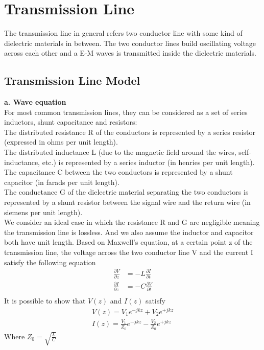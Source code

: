 \documentclass[a4paper]{article}
\begin{document}
\section{Transmission Line}
The transmission line in general refers two conductor line with some kind of dielectric materials in between. The two conductor lines build oscillating voltage across each other and a E-M waves is transmitted inside the dielectric materials.
\subsection{Transmission Line Model}
{\bf a. Wave equation}\\
For most common transmission lines, they can be considered as a set of series inductors, shunt capacitance and resistors:\\
The distributed resistance R of the conductors is represented by a series resistor (expressed in ohms per unit length).\\
The distributed inductance L (due to the magnetic field around the wires, self-inductance, etc.) is represented by a series inductor (in henries per unit length).\\
The capacitance C between the two conductors is represented by a shunt capacitor (in farads per unit length).\\
The conductance G of the dielectric material separating the two conductors is represented by a shunt resistor between the signal wire and the return wire (in siemens per unit length).\\
We consider an ideal case in which the resistance R and G are negligible meaning the transmission line is lossless. And we also assume the inductor and capacitor both have unit length. Based on Maxwell's equation, at a certain point z of the transmission line, the voltage across the two conductor line V and the current I satisfy the following equation
\begin{align*}
	\frac{\partial V}{\partial z} & = -L \frac{\partial I}{\partial t} \\
	\frac{\partial I}{\partial z} & = -C \frac{\partial V}{\partial t} \\
\end{align*}
It is possible to show that $V(z)$ and $I(z)$ satisfy
\begin{align*}
	V(z) = V_1 e^{-jkz} + V_2 e^{+jkz} \\
	I(z) = \frac{V_1}{Z_0} e^{-jkz} - \frac{V_2}{Z_0} e^{+jkz}
\end{align*}
Where $Z_0 = \sqrt{\frac{L}{C}}$\\
\end{document}
